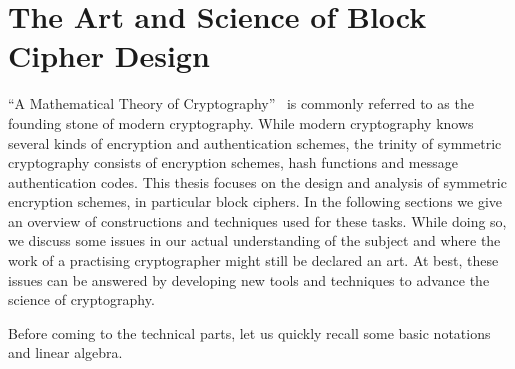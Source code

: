 \chapter{The Art and Science of Block Cipher Design}\label{ch:prelim}

\vspace*{-\baselineskip}
\hspace{1.5em} \enquote{A Mathematical Theory of Cryptography}~ is commonly referred to as the founding stone of modern cryptography.
While modern cryptography knows several kinds of encryption and authentication schemes, the trinity of symmetric cryptography consists of encryption schemes, hash functions and message authentication codes.
This thesis focuses on the design and analysis of symmetric encryption schemes, in particular block ciphers.
In the following sections we give an overview of constructions and techniques used for these tasks.
While doing so, we discuss some issues in our actual understanding of the subject and where the work of a practising cryptographer might still be declared an art.
At best, these issues can be answered by developing new tools and techniques to advance the science of cryptography.

Before coming to the technical parts, let us quickly recall some basic notations and linear algebra.
